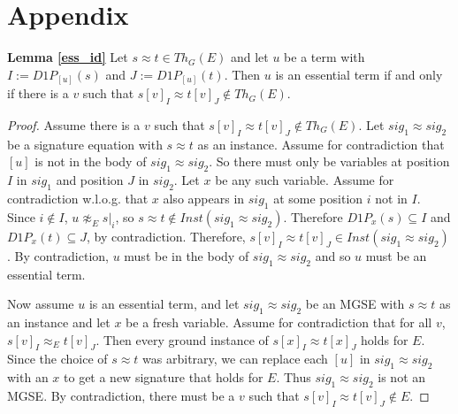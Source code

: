 \appendix
\section*{Appendix}



\textbf{Lemma \ref{ess_id} } Let $s \approx t \in Th_G(E)$ and let $u$ be a term with $I := D1P_{[u]}(s)$ and $J := D1P_{[u]}(t)$.
Then  $u$ is an essential term if and only if there is a $v$ such that $s[v]_I \approx t[v]_J \not\in Th_G(E)$.
\begin{proof}
Assume there is a $v$ such that $s[v]_I \approx t[v]_J \not\in Th_G(E)$.
Let $sig_1 \approx sig_2$ be a signature equation with $s \approx t$ as an instance.
Assume for contradiction that $[u]$ is not in the body of  $sig_1 \approx sig_2$.
So there must only be variables at position $I$ in $sig_1$ and position $J$ in $sig_2$.
Let $x$ be any such variable.
Assume for contradiction w.l.o.g. that $x$ also appears in $sig_1$ at some position $i$ not in $I$.
Since $i \not\in I$, $u \not\approx_E s|_i$, so $s \approx t \not\in Inst(sig_1 \approx sig_2)$. 
Therefore $D1P_x(s) \subseteq I$ and $D1P_x(t) \subseteq J$, by contradiction.
Therefore, $s[v]_I \approx t[v]_J \in Inst(sig_1 \approx sig_2)$.
By contradiction, $u$ must be in the body of $sig_1 \approx sig_2$ and so $u$ must be an essential term. 

Now assume $u$ is an essential term, and let $sig_1 \approx sig_2$ be an MGSE with $s \approx t$ as an instance and let $x$ be a fresh variable. 
Assume for contradiction that for all $v$, $s[v]_I \approx_E t[v]_J$. 
Then every ground instance of $s[x]_I \approx t[x]_J$ holds for $E$.
Since the choice of $s \approx t$ was arbitrary, we can replace each $[u]$ in $sig_1 \approx sig_2$ with an $x$ to get a new signature that holds for $E$.
Thus $sig_1 \approx sig_2$ is not an MGSE.
By contradiction, there must be a $v$ such that $s[v]_I \approx t[v]_J \not\in E$.
\end{proof}

